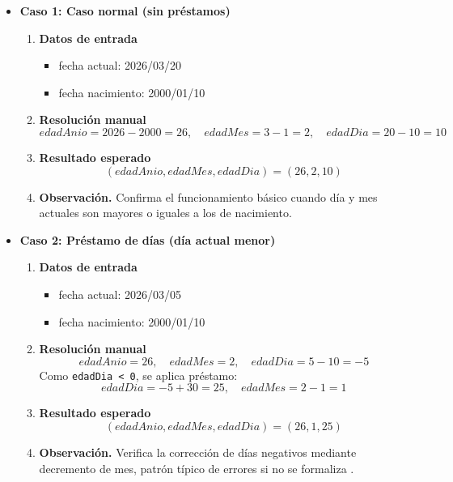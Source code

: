 \documentclass[12pt,twoside]{book}
\begin{document}
						\begin{itemize}
							
							\item \textbf{Caso 1: Caso normal (sin préstamos)}
							\begin{enumerate}
								\item \textbf{Datos de entrada}
								\begin{itemize}
									\item fecha actual: 2026/03/20
									\item fecha nacimiento: 2000/01/10
								\end{itemize}
								\item \textbf{Resolución manual}
								\[
								edadAnio = 2026 - 2000 = 26,\quad
								edadMes = 3 - 1 = 2,\quad
								edadDia = 20 - 10 = 10
								\]
								\item \textbf{Resultado esperado}
								\[
								(edadAnio,edadMes,edadDia) = (26,2,10)
								\]
								\item \textbf{Observación.} Confirma el funcionamiento básico cuando día y mes actuales son mayores o iguales a los de nacimiento.
							\end{enumerate}
							
							\item \textbf{Caso 2: Préstamo de días (día actual menor)}
							\begin{enumerate}
								\item \textbf{Datos de entrada}
								\begin{itemize}
									\item fecha actual: 2026/03/05
									\item fecha nacimiento: 2000/01/10
								\end{itemize}
								\item \textbf{Resolución manual}
								\[
								edadAnio = 26,\quad edadMes = 2,\quad edadDia = 5 - 10 = -5
								\]
								Como \texttt{edadDia < 0}, se aplica préstamo:
								\[
								edadDia = -5 + 30 = 25,\quad edadMes = 2 - 1 = 1
								\]
								\item \textbf{Resultado esperado}
								\[
								(edadAnio,edadMes,edadDia) = (26,1,25)
								\]
								\item \textbf{Observación.} Verifica la corrección de días negativos mediante decremento de mes, patrón típico de errores si no se formaliza \cite{Qian2018Students}.
							\end{enumerate}
							

\end{itemize}
\end{document}
